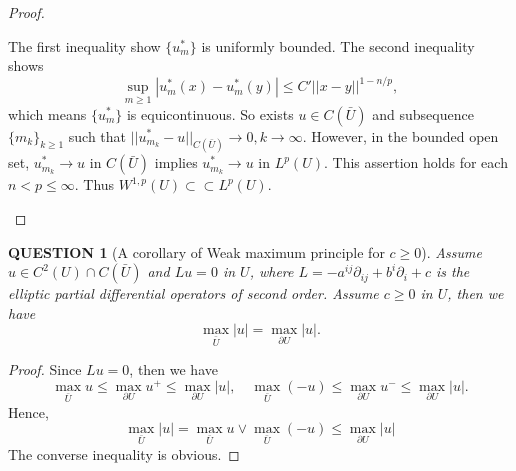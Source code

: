 \documentclass[12pt]{article}
\renewcommand{\(}{\left(}%
\renewcommand{\)}{\right)}%
\renewcommand{\[}{\left[}%
\renewcommand{\]}{\right]}%
\newtheorem{question}{QUESTION}[section]}
\newtheorem{proof}{Proof.}}
\begin{document}
\begin{proof}
\begin{enumerate}
\begin{enumerate}
\begin{equation*}
     \end{equation*}
     The first inequality show $\{u_m^*\}$ is uniformly bounded. The second inequality shows
     \begin{equation*}
      \sup_{m\geq 1}|u_m^*(x)-u_m^*(y)|\leq C'||x-y||^{1-n/p},
     \end{equation*}
     which means $\{u^*_m\}$ is equicontinuous. So exists $u\in C(\bar{U} )$ and subsequence $\{m_k\}_{k\geq 1}$ such that $||u_{m_k}^*-u||_{C(\bar{U} )}\to0,k\to\infty$. However, in the bounded open set, $u_{m_k}^*\to u$ in $C(\bar{U} )$ implies $u_{m_k}^*\to u$ in $L^p(U)$. This assertion holds for each $n<p\leq \infty$. Thus $W^{1,p}(U)\subset\subset L^p(U)$.
    \end{enumerate}
   \end{enumerate}
  \end{proof}

  \begin{question}[A corollary of Weak maximum principle for $c\geq 0$] Assume $u\in C^2(U)\cap C(\bar{U})$ and $Lu=0$ in $U$, where $L=-a^{ij}\partial_{ij}+b^i\partial_i+c$ is the elliptic partial differential operators of second order. Assume $c\geq 0$ in $U$, then we have
  \begin{equation*}
   \max_{\bar{U}}|u|=\max_{\partial U}|u|.
  \end{equation*}
  \end{question}
  \begin{proof}
   Since $Lu=0$, then we have
   \begin{equation*}
    \max_{\bar{U}}u\leq \max_{\partial U}u^+\leq \max_{\partial U}|u| ,\quad \max_{\bar{U}}(-u)\leq \max_{\partial U}u^-\leq \max_{\partial U}|u|.
   \end{equation*}
   Hence,
   \begin{equation*}
    \max_{\bar{U}}|u|=\max_{\bar{U}}u\vee \max_{\bar{U}}(-u) \leq \max_{\partial U}|u|
   \end{equation*}
   The converse inequality is obvious.
  \end{proof}
\end{document}
